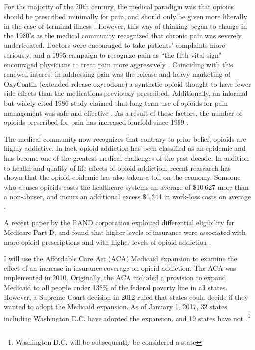\documentclass[11pt]{article}
\begin{document}
For the majority of the 20th century, the medical paradigm was that opioids should be prescribed minimally for pain, and should only be given more liberally in the case of terminal illness \citep{Meldrum2016}.  However, this way of thinking began to change in the 1980's as the medical community recognized that chronic pain was severely undertreated.  Doctors were encouraged to take patients' complaints more seriously, and a 1995 campaign to recognize pain as ``the fifth vital sign" encouraged physicians to treat pain more aggressively \citep{Kolodny2015}.  Coinciding with this renewed interest in addressing pain was the release and heavy marketing of OxyContin (extended release oxycodone) a synthetic opioid thought to have fewer side effects than the medications previously prescribed. Additionally, an informal but widely cited 1986 study claimed that long term use of opioids for pain management was safe and effective \citep{Kolodny2015, Portenoy1986}.  As a result of these factors, the number of opioids prescribed for pain has increased fourfold since 1999 \citep{CentersforDiseaseControlandPrevention}.  

The medical community now recognizes that contrary to prior belief, opioids are highly addictive. In fact, opioid addiction has been classified as an epidemic and has become one of the greatest medical challenges of the past decade.  In addition to health and quality of life effects of opioid addiction, recent reasearch has shown that the opioid epidemic has also taken a toll on the economy.  Someone who abuses opioids costs the healthcare systems an average of \$10,627 more than a non-abuser, and incurs an additional excess \$1,244 in work-loss costs on average \citep{Rice2014}.

A recent paper by the RAND corporation exploited differential eligibility for Medicare Part D, and found that higher levels of insurance were associated with more opioid prescriptions and with higher levels of opioid addiction \citep{Powell2016}.  


I will use the Affordable Care Act (ACA) Medicaid expansion to examine the effect of an increase in insurance coverage on opioid addiction.  The ACA was implemented in 2010. Originally, the ACA included a provision to expand Medicaid to all people under 138\% of the federal poverty line in all states.  However, a Supreme Court decision in 2012 ruled that states could decide if they wanted to adopt the Medicaid expansion.  As of January 1, 2017, 32 states including Washington D.C. have adopted the expansion, and 19 states have not \citep{TheHenryJ.KaiserFamilyFoundation2017}.\footnote{Washington D.C. will be subsequently be considered a state}  
\end{document}
